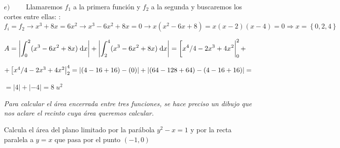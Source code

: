 \begin{proofw}
\vspace{2mm}$e) \qquad$  Llamaremos $f_1$ a la primera función y $f_2$ a la segunda y buscaremos los cortes entre ellas: : $f_i=f_2 \to x^3+8x=6x^2 \to x^3-6x^2+8x=0 \to x(x^2-6x+8)=x(x-2)(x-4)=0 \Rightarrow x=\left\{ 0, 2 , 4 \right\}$

$A=\displaystyle \left| \int_{0}^{2} (x^3-6x^2+8x)\;  \dd x \right| + 
\left| \int_{2}^{4 } (x^3-6x^2+8x) \; \dd x \right| =
\eval[x^4/4-2x^3+4x^2|_0^2 +$

$+ \eval[x^4/4-2x^3+4x^2|_2^4 =
\left| (4-16+16)-(0) \right| + \left| (64-128+64)-(4-16+16) \right|=$ 

$=|4|+|-4|= 8\; u^2$

 
\end{proofw}

\emph{Para calcular el área encerrada entre tres funciones, se hace preciso un dibujo que nos aclare el recinto cuya área queremos calcular.}

\begin{ejre}
Calcula el área del plano limitado por la parábola $y^2-x=1$ y por la recta paralela a $y=x$	que pasa por el punto $(-1,0)$
\end{ejre}

